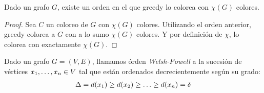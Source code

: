 \begin{corollary}
  Dado un grafo $G$, existe un orden en el que greedy lo colorea con $\chi(G)$ colores.
\end{corollary}
\begin{proof}
  Sea $C$ un coloreo de $G$ con $\chi(G)$ colores. Utilizando el orden anterior, greedy colorea a $G$ con a lo sumo $\chi(G)$ colores. Y por definición de $\chi$, lo colorea con exactamente $\chi(G)$.
\end{proof}

\begin{definition}
  Dado un grafo $G=(V,E)$, llamamos órden \emph{Welsh-Powell} a la sucesión de vértices $x_1, \mathellipsis, x_n \in V$ tal que están ordenados decrecientemente según su grado:
  \begin{align}
    \Delta = d(x_1) \ge d(x_2) \ge \mathellipsis \ge d(x_n) = \delta
  \end{align}
\end{definition}
